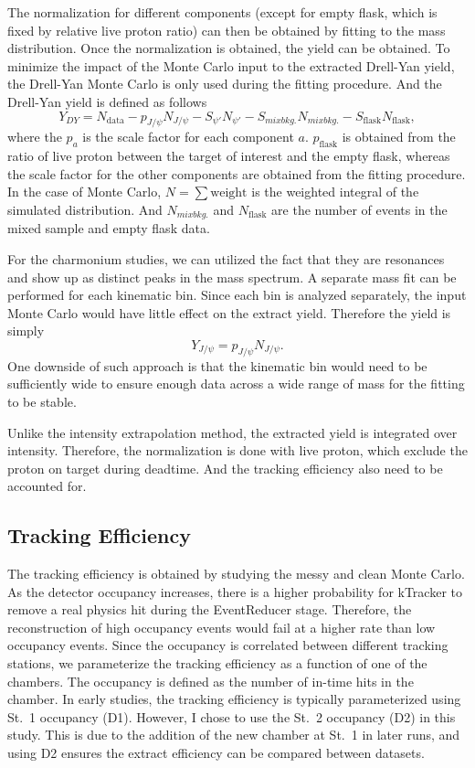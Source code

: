 \documentclass[../main.tex]{subfiles}
\begin{document}
The normalization for different components (except for empty flask, which is fixed by relative live proton ratio)
can then be obtained by fitting to the mass distribution. Once the normalization is obtained, the yield can be
obtained. To minimize the impact of the Monte Carlo input to the extracted Drell-Yan yield, the Drell-Yan Monte
Carlo is only used during the fitting procedure. And the Drell-Yan yield is defined as follows
\begin{equation}
	Y_{DY}= N_{\textrm{data}}-p_{J/\psi} N_{J/\psi}-S_{\psi'} N_{\psi'}-S_{mix bkg.} N_{mix bkg.} - S_{\textrm{flask}} N_{\textrm{flask}},
\end{equation}
where the $p_a$ is the scale factor for each component $a$. $p_{\textrm{flask}}$ is obtained from the
ratio of live proton between the target of interest and the empty flask,
whereas the scale factor for the other components are obtained from the fitting procedure.
In the case of Monte Carlo, $N=\sum\textrm{weight}$  is the weighted integral of the
simulated distribution. And $N_{mix bkg.}$ and $N_{\textrm{flask}}$ are the number of events in the mixed
sample and empty flask data.

For the charmonium studies, we can utilized the fact that they are resonances and show up as distinct peaks
in the mass spectrum. A separate mass fit can be performed for each kinematic bin. Since each bin is analyzed
separately, the input Monte Carlo would have little effect on the extract yield. Therefore the yield is simply
\begin{equation}
	Y_{J/\psi}= p_{J/\psi} N_{J/\psi}.
\end{equation}
One downside of such approach is that the kinematic bin would need to be sufficiently wide to ensure enough
data across a wide range of mass for the fitting to be stable.

Unlike the intensity extrapolation method, the extracted yield is integrated over intensity. Therefore, the
normalization is done with live proton, which exclude the proton on target during deadtime. And the tracking
efficiency also need to be accounted for.

\subsection{Tracking Efficiency}
The tracking efficiency is obtained by studying the messy and clean Monte Carlo.
As the detector occupancy increases, there is a higher probability for kTracker to
remove a real physics hit during the EventReducer stage. Therefore, the reconstruction of high occupancy
events would fail at a higher rate than low occupancy events. Since the occupancy
is correlated between different tracking stations, we parameterize the tracking efficiency
as a function of one of the chambers. The occupancy is defined as the number of
in-time hits in the chamber. In early studies, the tracking efficiency is
typically parameterized using St.~1 occupancy (D1).
However, I chose to use the St.~2 occupancy (D2) in this study. This
is due to the addition of the new chamber at St.~1 in later runs, and using D2 ensures the
extract efficiency can be compared between datasets.
\end{document}
